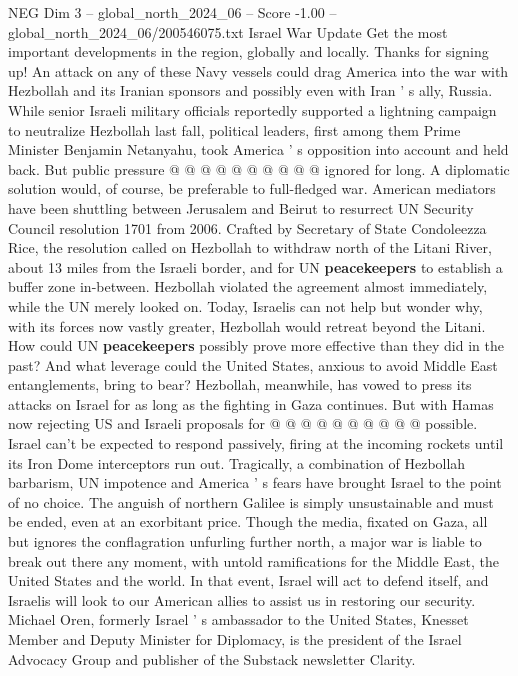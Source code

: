 \begin{textsample}{NEG Dim 3 – global\_north\_2024\_06 – Score -1.00 – global\_north\_2024\_06/200546075.txt}
Israel War Update Get the most important developments in the region, globally and locally.
Thanks for signing up!
An attack on any of these Navy vessels could drag America into the war with Hezbollah and its Iranian sponsors and possibly even with Iran ' s ally, Russia.
While senior Israeli military officials reportedly supported a lightning campaign to neutralize Hezbollah last fall, political leaders, first among them Prime Minister Benjamin Netanyahu, took America ' s opposition into account and held back.
But public pressure @ @ @ @ @ @ @ @ @ @ ignored for long.
A diplomatic solution would, of course, be preferable to full-fledged war.
American mediators have been shuttling between Jerusalem and Beirut to resurrect UN Security Council resolution 1701 from 2006.
Crafted by Secretary of State Condoleezza Rice, the resolution called on Hezbollah to withdraw north of the Litani River, about 13 miles from the Israeli border, and for UN \textbf{peacekeepers} to establish a buffer zone in-between.
Hezbollah violated the agreement almost immediately, while the UN merely looked on.
Today, Israelis can not help but wonder why, with its forces now vastly greater, Hezbollah would retreat beyond the Litani.
How could UN \textbf{peacekeepers} possibly prove more effective than they did in the past?
And what leverage could the United States, anxious to avoid Middle East entanglements, bring to bear?
Hezbollah, meanwhile, has vowed to press its attacks on Israel for as long as the fighting in Gaza continues.
But with Hamas now rejecting US and Israeli proposals for @ @ @ @ @ @ @ @ @ @ possible.
Israel can't be expected to respond passively, firing at the incoming rockets until its Iron Dome interceptors run out.
Tragically, a combination of Hezbollah barbarism, UN impotence and America ' s fears have brought Israel to the point of no choice.
The anguish of northern Galilee is simply unsustainable and must be ended, even at an exorbitant price.
Though the media, fixated on Gaza, all but ignores the conflagration unfurling further north, a major war is liable to break out there any moment, with untold ramifications for the Middle East, the United States and the world.
In that event, Israel will act to defend itself, and Israelis will look to our American allies to assist us in restoring our security.
Michael Oren, formerly Israel ' s ambassador to the United States, Knesset Member and Deputy Minister for Diplomacy, is the president of the Israel Advocacy Group and publisher of the Substack newsletter Clarity.

\end{textsample}
